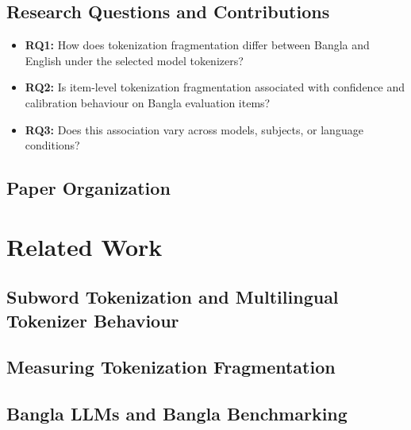 \documentclass[runningheads]{llncs}
\begin{document}
\subsection{Research Questions and Contributions}
\begin{itemize}
  \item \textbf{RQ1:} How does tokenization fragmentation differ between Bangla and English under the selected model tokenizers?
  \item \textbf{RQ2:} Is item-level tokenization fragmentation associated with confidence and calibration behaviour on Bangla evaluation items?
  \item \textbf{RQ3:} Does this association vary across models, subjects, or language conditions?
\end{itemize}

\subsection{Paper Organization}

\section{Related Work}
\subsection{Subword Tokenization and Multilingual Tokenizer Behaviour}

\subsection{Measuring Tokenization Fragmentation}

\subsection{Bangla LLMs and Bangla Benchmarking}
\end{document}
